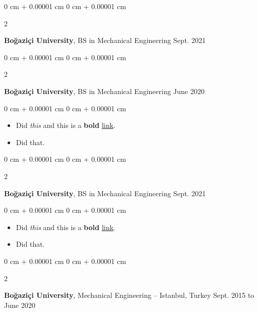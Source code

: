 \documentclass[10pt, letterpaper]{article}
\newenvironment{highlights}{
    \begin{itemize}[
        topsep=0.10 cm,
        parsep=0.10 cm,
        partopsep=0pt,
        itemsep=0pt,
        leftmargin=0 cm + 10pt
    ]
}{
    \end{itemize}
        
    \vspace{-0.10cm}
} %
\newenvironment{onecolentry}{
    \begin{adjustwidth}{
        0 cm + 0.00001 cm
    }{
        0 cm + 0.00001 cm
    }
}{
    \end{adjustwidth}
} %
\newenvironment{twocolentry}[2][]{
    \onecolentry
    \def\secondColumn{#2}
    \setcolumnwidth{\fill, 4.1 cm}
    \begin{paracol}{2}
}{
    \switchcolumn \raggedleft \secondColumn
    \end{paracol}
    \endonecolentry
} %
\begin{document}
        \begin{twocolentry}{
            Sept. 2021
        }
            \textbf{Boğaziçi University}, BS in Mechanical Engineering\end{twocolentry}

        \vspace{0.10 cm}


        \vspace{0.15 cm}

        \begin{twocolentry}{
            June 2020
        }
            \textbf{Boğaziçi University}, BS in Mechanical Engineering\end{twocolentry}

        \vspace{0.10 cm}
        \begin{onecolentry}
            \begin{highlights}
                \item Did \textit{this} and this is a \textbf{bold} \href{https://example.com}{link}.
                \item Did that.
            \end{highlights}
        \end{onecolentry}


        \vspace{0.15 cm}

        \begin{twocolentry}{
            Sept. 2021
        }
            \textbf{Boğaziçi University}, BS in Mechanical Engineering\end{twocolentry}

        \vspace{0.10 cm}
        \begin{onecolentry}
            \begin{highlights}
                \item Did \textit{this} and this is a \textbf{bold} \href{https://example.com}{link}.
                \item Did that.
            \end{highlights}
        \end{onecolentry}


        \vspace{0.15 cm}

        \begin{twocolentry}{
            Sept. 2015 to June 2020
        }
            \textbf{Boğaziçi University}, Mechanical Engineering -- Istanbul, Turkey\end{twocolentry}
\end{document}

